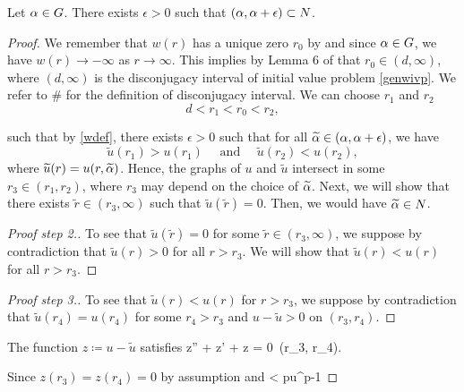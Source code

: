 \begin{lemma}\label{genlem7}
Let $\alpha \in G$. There exists $\epsilon > 0$ such that $(\alpha, \alpha + \epsilon)
\subset N$. 
\end{lemma}
\begin{proof}
\donegroup
We remember that $w(r)$ has a unique zero $r_0$ by  and since $\alpha
\in G$, we have $w(r) \to -\infty$ as $r \to \infty$. 
This implies by Lemma 6 of \cite[p.~249]{kwong} that $r_0 \in (d, \infty)$,
where $(d, \infty)$ is the disconjugacy interval of initial value problem 
\eqref{genwivp}.  We {\red refer to \#} for the definition of disconjugacy
interval. We can choose $r_1$ and $r_2$
\[ d < r_1 < r_0 < r_2, \]

such that by \eqref{wdef}, there exists $\epsilon > 0$ 
such that for all $\widetilde{\alpha} \in (\alpha, \alpha + \epsilon)$, we have
\[
\tilde{u}(r_1) > u(r_1)\quad\text{ and }\quad \tilde{u}(r_2) < u(r_2),
\]
\endgroup
where $\widetilde{u}(r) = u(r, \widetilde{\alpha})$. Hence, the graphs of $u$ and $\tilde{u}$
intersect in some $r_3 \in (r_1, r_2)$, where $r_3$ may depend on the choice of
$\widetilde{\alpha}$. Next, we will show that there exists $\tilde{r} \in (r_3, \infty)$
such that $\tilde{u}(\tilde{r}) = 0$. Then, we would have $\widetilde{\alpha} \in N$.

\begin{proof}[Proof step 2.] To see that $\tilde{u}(\tilde{r})=0$ for some
$\tilde{r} \in (r_3, \infty)$, we suppose by contradiction that 
$\tilde{u}(r) > 0$ for all $r > r_3$. We will show that $\tilde{u}(r) < u(r)$
for all $r > r_3$. 
\end{proof}

\begin{proof}[Proof step 3.] To see that $\tilde{u}(r) < u(r)$ for $r > r_3$, we
suppose by contradiction that $\tilde{u}(r_4) = u(r_4)$ for some $r_4 > r_3$ and
$u - \tilde{u} > 0$ on $(r_3, r_4)$.
\end{proof}

The function $z \coloneqq u - \tilde{u}$ satisfies
\be \label{zivp}
z'' +  z' +  z = 0\quad{}~(r_3, r_4). 
\ee


Since $z(r_3) = z(r_4) = 0$ by assumption and
\be \label{zcomp} 
 < pu^{p-1} 
\ee


\end{proof}
